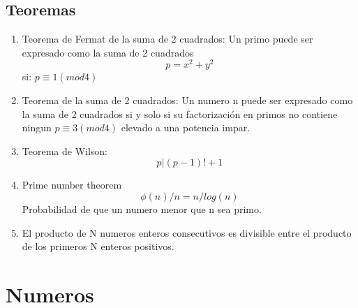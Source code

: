 %
%
%
%
% 
%
%
%



\subsection{Teoremas}
\begin{enumerate}

\item
Teorema de Fermat de la suma de 2 cuadrados:
Un primo puede ser expresado como la suma de 2 cuadrados
\begin{equation}
  p=x^2+y^2
\end{equation}
si: $p\equiv 1 (mod 4)$

\item
Teorema de la suma de 2 cuadrados:
Un numero n puede ser expresado como la suma de 2 cuadrados si y solo si su factorización en primos no contiene ningun $p \equiv 3(mod 4) $ elevado a una potencia impar.

\item
Teorema de Wilson:
\begin{equation}
    p|(p-1)!+1
\end{equation}

\item
Prime number theorem \begin{equation} \phi(n)/n = n/log(n) \end{equation}
Probabilidad de que un numero menor que n sea primo.
\item
El producto de N numeros enteros consecutivos es divisible entre el producto de los primeros N enteros positivos.
\end{enumerate}

\section{Numeros}

